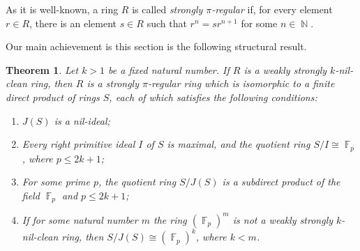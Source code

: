 \documentclass{amsart}
\DeclareMathOperator{\N}{\mathbb{N}}
\DeclareMathOperator{\F}{\mathbb{F}}
\newtheorem{theorem}{Theorem}[section]
\theoremstyle{definition}
\theoremstyle{remark}
\numberwithin{equation}{section}
\begin{document}
As it is well-known, a ring $R$ is called {\it strongly $\pi$-regular} if, for every element $r\in R$, there is an element $s\in R$ such that $r^n=sr^{n+1}$ for some $n\in\N$.

\medskip

Our main achievement is this section is the following structural result.

\begin{theorem}\label{tha2} Let $k>1$ be a fixed natural number. If $R$ is a weakly strongly $k$-nil-clean ring, then $R$ is a strongly $\pi$-regular ring which is isomorphic to a finite direct product of rings $S$, each of which satisfies the following conditions:
\begin{enumerate}
\item[(a)] $J(S)$ is a nil-ideal;
\item[(b)] Every right primitive ideal $I$ of $S$ is maximal, and the quotient ring $S/I\cong\F_p$, where $p\leq 2k+1$;
\item[(c)] For some prime $p$, the quotient ring $S/J(S)$ is a subdirect product of the field $\F_p$ and $p\leq 2k+1$;
\item[(d)] If for some natural number $m$ the ring $(\F_p)^m$ is not a weakly strongly $k$-nil-clean ring, then $S/J(S)\cong (\F_p)^k$, where $k<m$.
\end{enumerate}
\end{theorem}
\end{document}
